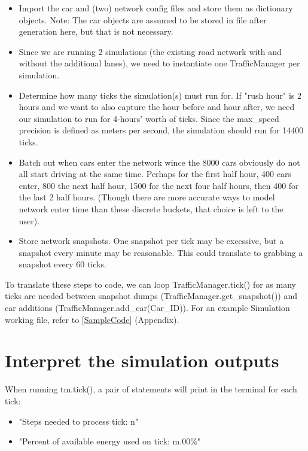 \begin{itemize}
    \item Import the car and (two) network config files and store them as dictionary objects.  Note:  The car objects are assumed to be stored in file after generation here, but that is not necessary.
    \item Since we are running 2 simulations (the existing road network with and without the additional lanes), we need to instantiate one TrafficManager per simulation.
    \item Determine how many ticks the simulation(s) must run for.  If "rush hour" is 2 hours and we want to also capture the hour before and hour after, we need our simulation to run for 4-hours' worth of ticks.  Since the max\_speed precision is defined as meters per second, the simulation should run for 14400 ticks.
    \item Batch out when cars enter the network wince the 8000 cars obviously do not all start driving at the same time.  Perhaps for the first half hour, 400 cars enter, 800 the next half hour, 1500 for the next four half hours, then 400 for the last 2 half hours. (Though there are more accurate ways to model network enter time than these discrete buckets, that choice is left to the user).
    \item Store network snapshots.  One snapshot per tick may be excessive, but a snapshot every minute may be reasonable.  This could translate to grabbing a snapshot every 60 ticks.
\end{itemize}

\noindent To translate these steps to code, we can loop TrafficManager.tick() for as many ticks are needed between snapshot dumps (TrafficManager.get\_snapshot()) and car additions (TrafficManager.add\_car(Car\_ID)).  For an example Simulation working file, refer to \autoref{SampleCode} (Appendix).


\section{Interpret the simulation outputs}

\par When running tm.tick(), a pair of statements will print in the terminal for each tick:

\begin{itemize}
    \item "Steps needed to process tick:  n"
    \item "Percent of available energy used on tick:  m.00\%"
\end{itemize}

